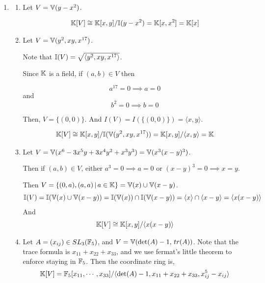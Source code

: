 \documentclass[Notebook.tex]{subfiles}
\begin{document}
\begin{solution}
\begin{enumerate}[label=(\alph*),ref=\theenumi\alph*]
        \item 
        \begin{enumerate}[label=(\roman*), ref=\theenumi\roman*]
            \item Let $V = \mathbb V(y-x^2)$. 
            
            \[\mathbb K[V] \cong \mathbb K[x,y]/\mathbb I(y - x^2) = \mathbb K[x, x^2] = \mathbb K[x]\]

            \item Let $V = \mathbb V(y^2, xy, x^{17})$. 
            
            Note that $\mathbb I(V) = \sqrt{\langle y^2, xy, x^{17} \rangle }$. 
            
            Since $\mathbb K$ is a field, if $(a, b) \in V$ then
            
            \[a^{17} = 0 \implies a = 0\]
            and 
            \[b^2 = 0 \implies b = 0\]

            Then, $V = \{(0, 0)\}$. And $I(V) = I (\{(0,0)\}) = \langle x, y \rangle$. 


            \[\mathbb K[V] \cong \mathbb K[x,y]/\mathbb I(\mathbb V(y^2, xy, x^{17})) = \mathbb K[x,y] / \langle x, y \rangle = \mathbb K\]

            \item Let $V = \mathbb V(x^6 - 3x^5y + 3x^4y^2 + x^3y^3) = \mathbb V(x^3(x-y)^3)$. 
            
            Then if $(a, b) \in V$, either $a^3 = 0 \implies a = 0$ or $(x-y)^3 = 0 \implies x = y$. 
            
            Then $V = \{(0, a), (a, a) \, | \, a \in \mathbb K\} = \mathbb V(x) \cup \mathbb V(x-y)$. 
            \[\mathbb I(V) = \mathbb I(\mathbb V(x) \cup \mathbb V(x-y)) = \mathbb I(\mathbb V(x)) \cap \mathbb I(\mathbb V(x-y)) = \langle x \rangle \cap \langle x-y \rangle = \langle x(x-y) \rangle \]
            And 
            \[\mathbb K[V] \cong \mathbb K[x,y]/\langle x(x-y) \rangle \]
            
            \item Let $A = (x_{ij}) \in SL_3(\mathbb F_5)$, and $V = \mathbb V(\det(A) - 1, \, tr(A))$. Note that the trace formula is $x_{11} + x_{22} + x_{33}$, and we use fermat's little theorem to enforce staying in $\mathbb F_5$. Then the coordinate ring is, 
            \[\mathbb K[V] = \mathbb F_5[x_{11} , \cdots, x_{33}] / \langle \det(A) - 1, x_{11} + x_{22} + x_{33}, x_{ij}^5 - x_{ij} \rangle\]
        \end{enumerate}
    \end{enumerate}
\end{solution}

\newpage 

\hrulefill
\end{document}
